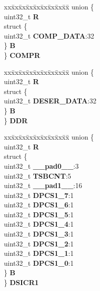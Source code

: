 \begin{DoxyCompactItemize}
\begin{tabbing}
\end{tabbing}\item 
\mbox{\label{structDSPI__tag_ade717364e0a5b3c85e630d5872d299cd}} 
\begin{tabbing}
xx\=xx\=xx\=xx\=xx\=xx\=xx\=xx\=xx\=\kill
union \{\\
\>uint32\_t {\bfseries R}\\
\>struct \{\\
\>\>uint32\_t {\bfseries COMP\_DATA}:32\\
\>\} {\bfseries B}\\
\} {\bfseries COMPR}\\

\end{tabbing}\item 
\mbox{\label{structDSPI__tag_ac1773f1d5de3b2af9fd18f8adf90a3a0}} 
\begin{tabbing}
xx\=xx\=xx\=xx\=xx\=xx\=xx\=xx\=xx\=\kill
union \{\\
\>uint32\_t {\bfseries R}\\
\>struct \{\\
\>\>uint32\_t {\bfseries DESER\_DATA}:32\\
\>\} {\bfseries B}\\
\} {\bfseries DDR}\\

\end{tabbing}\item 
\mbox{\label{structDSPI__tag_a79a5d7f90493c57c56a88307e5f7ba6d}} 
\begin{tabbing}
xx\=xx\=xx\=xx\=xx\=xx\=xx\=xx\=xx\=\kill
union \{\\
\>uint32\_t {\bfseries R}\\
\>struct \{\\
\>\>uint32\_t {\bfseries \_\_pad0\_\_}:3\\
\>\>uint32\_t {\bfseries TSBCNT}:5\\
\>\>uint32\_t {\bfseries \_\_pad1\_\_}:16\\
\>\>uint32\_t {\bfseries DPCS1\_7}:1\\
\>\>uint32\_t {\bfseries DPCS1\_6}:1\\
\>\>uint32\_t {\bfseries DPCS1\_5}:1\\
\>\>uint32\_t {\bfseries DPCS1\_4}:1\\
\>\>uint32\_t {\bfseries DPCS1\_3}:1\\
\>\>uint32\_t {\bfseries DPCS1\_2}:1\\
\>\>uint32\_t {\bfseries DPCS1\_1}:1\\
\>\>uint32\_t {\bfseries DPCS1\_0}:1\\
\>\} {\bfseries B}\\
\} {\bfseries DSICR1}\\


\end{tabbing}
\end{DoxyCompactItemize}
